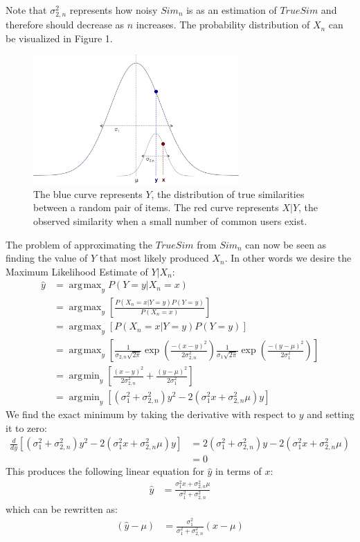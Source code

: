 \documentclass[11pt]{article}
\DeclareMathOperator*{\argmax}{arg\!\max}
\DeclareMathOperator*{\argmin}{arg\!\min}
\begin{document}
Note that $\sigma_{2, n}^2$ represents how noisy $Sim_n$ is as an estimation of
$TrueSim$ and therefore should decrease as $n$ increases. The probability
distribution of $X_n$ can be visualized in Figure 1.

\begin{figure}[!htbp]
    \centering
    \includegraphics[width=0.7\textwidth]{twonormals.png}
	\caption{The blue curve represents $Y$, the distribution of true
    similarities between a random pair of items. The red curve represents $X|Y$,
    the observed similarity when a small number of common users exist.}
    \label{fig:two_normals}
\end{figure}

The problem of approximating the $TrueSim$ from $Sim_n$ can now be seen as
finding the value of $Y$ that most likely produced $X_n$. In other words we 
desire the Maximum Likelihood Estimate of $Y | X_n$:
\begin{align}
\hat{y} &= \argmax_yP(Y=y|X_n=x) 
\\&= \argmax_y\left[\frac{P(X_n=x | Y=y)P(Y=y)}{P(X_n=x)}\right]
\\&= \argmax_y\left[P(X_n=x|Y=y)P(Y=y)\right]
\\&= 
\argmax_y\left[\frac{1}{\sigma_{2,n}\sqrt{2\pi}}\exp{\left(\frac{-(x-y)^2}
{2\sigma_{2,n}^2}\right)}
\frac{1}{\sigma_{1}\sqrt{2\pi}}\exp{\left(\frac{-(y-\mu)^2}
{2\sigma_{1}^2}\right)}\right]
\\&= \argmin_y\left[\frac{(x-y)^2}{2\sigma_{2,n}^2} +
\frac{(y-\mu)^2}{2\sigma_{1}^2}\right]
\\&= \argmin_y\left[\left(\sigma_{1}^2+\sigma_{2,n}^2\right)y^2 - 
2\left(\sigma_{1}^2x+\sigma_{2,n}^2\mu\right)y\right]
\end{align}
We find the exact minimum by taking the derivative with respect to $y$ and
setting it to zero:
\begin{align}
\frac{d}{dy}\left[\left(\sigma_{1}^2+\sigma_{2,n}^2\right)y^2 - 
2\left(\sigma_{1}^2x+\sigma_{2,n}^2\mu\right)y\right]
&= 2\left(\sigma_{1}^2+\sigma_{2,n}^2\right)y - 
2\left(\sigma_{1}^2x+\sigma_{2,n}^2\mu\right) 
\\&= 0
\end{align}
This produces the following linear equation for $\hat{y}$ in terms of $x$:
\begin{align}
\hat{y} &= \frac{\sigma_{1}^2x+\sigma_{2,n}^2\mu}{\sigma_{1}^2+\sigma_{2,n}^2}
\end{align}
which can be rewritten as:
\begin{align}
\left(\hat{y} - \mu\right) &= \frac{\sigma_{1}^2}{\sigma_{1}^2+\sigma_{2,n}^2}
\left(x-\mu\right)
\end{align}
\end{document}
